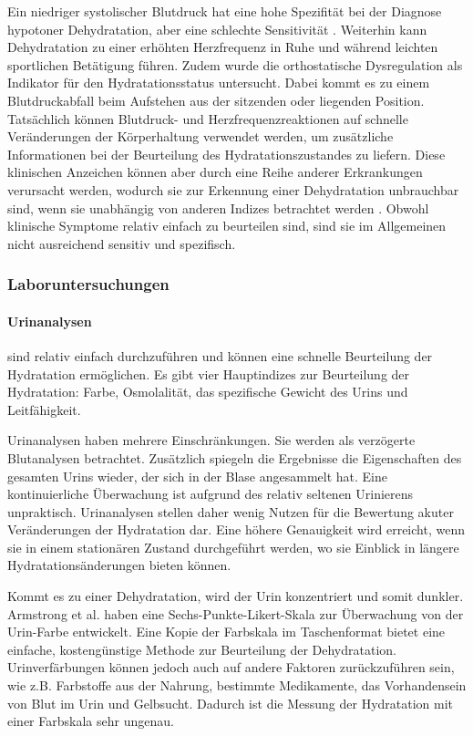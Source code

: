 \documentclass[10pt,a4paper,headinclude,twoside, plainheadsepline, open=right, numbers=noenddot, twocolumn]{article}
\begin{document}
Ein niedriger systolischer Blutdruck hat eine hohe Spezifität bei der Diagnose hypotoner Dehydratation, aber eine schlechte Sensitivität \cite{fortes2015elderly}.
Weiterhin kann Dehydratation zu einer erhöhten Herzfrequenz in Ruhe und während leichten sportlichen Betätigung führen.
Zudem wurde die orthostatische Dysregulation als Indikator für den Hydratationsstatus untersucht. 
Dabei kommt es zu einem Blutdruckabfall beim Aufstehen aus der sitzenden oder liegenden Position.
Tatsächlich können Blutdruck- und Herzfrequenzreaktionen auf schnelle Veränderungen der Körperhaltung verwendet werden, um zusätzliche Informationen bei der Beurteilung des Hydratationszustandes zu liefern.
Diese klinischen Anzeichen können aber durch eine Reihe anderer Erkrankungen verursacht werden, wodurch sie zur Erkennung einer Dehydratation unbrauchbar sind, wenn sie unabhängig von anderen Indizes betrachtet werden
\cite{garret2018engineering}
\cite{kavouras2002assessing}
\cite{davis1997effect}.
Obwohl klinische Symptome relativ einfach zu beurteilen sind, sind sie im Allgemeinen nicht ausreichend sensitiv und spezifisch.

\subsubsection{Laboruntersuchungen}
\label{laboruntersuchungen}

\paragraph{Urinanalysen} sind relativ einfach durchzuführen und können eine schnelle Beurteilung der Hydratation ermöglichen.
Es gibt vier Hauptindizes zur Beurteilung der Hydratation: Farbe, Osmolalität, das spezifische Gewicht des Urins und Leitfähigkeit.

Urinanalysen haben mehrere Einschränkungen.
Sie werden als verzögerte Blutanalysen betrachtet.
Zusätzlich spiegeln die Ergebnisse die Eigenschaften des gesamten Urins wieder, der sich in der Blase angesammelt hat.
Eine kontinuierliche Überwachung ist aufgrund des relativ seltenen Urinierens unpraktisch.
Urinanalysen stellen daher wenig Nutzen für die Bewertung akuter Veränderungen der Hydratation dar.
Eine höhere Genauigkeit wird erreicht, wenn sie in einem stationären Zustand durchgeführt werden, wo sie Einblick in längere Hydratationsänderungen bieten können.

Kommt es zu einer Dehydratation, wird der Urin konzentriert und somit dunkler.
Armstrong et al.\cite{armstrong1994urinary} haben eine Sechs-Punkte-Likert-Skala zur Überwachung von der Urin-Farbe entwickelt.
Eine Kopie der Farbskala im Taschenformat bietet eine einfache, kostengünstige Methode zur Beurteilung der Dehydratation.
Urinverfärbungen können jedoch auch auf andere Faktoren zurückzuführen sein, wie z.B. Farbstoffe aus der Nahrung, bestimmte Medikamente, das Vorhandensein von Blut im Urin und Gelbsucht\cite{garret2018engineering}.
Dadurch ist die Messung der Hydratation mit einer Farbskala sehr ungenau.
\end{document}
